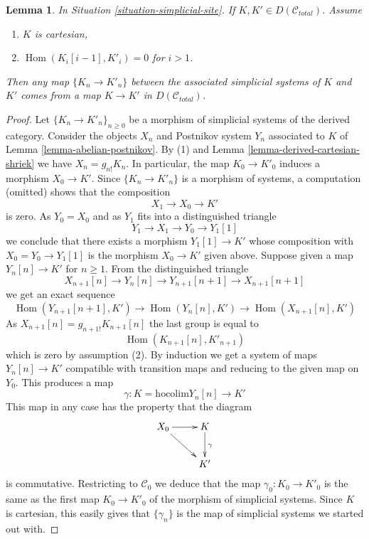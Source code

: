 \documentclass{stacks-project}
\theoremstyle{plain}
\newtheorem{lemma}[subsection]{Lemma}
\theoremstyle{definition}
\theoremstyle{remark}
\numberwithin{equation}{subsection}
\def\Hom{\mathop{\mathrm{Hom}}\nolimits}
\begin{document}
\begin{lemma}
\label{lemma-hom-cartesian-objects-derived}
In Situation \ref{situation-simplicial-site}.
If $K, K' \in D(\mathcal{C}_{total})$.
Assume
\begin{enumerate}
\item $K$ is cartesian,
\item $\Hom(K_i[i - 1], K'_i) = 0$ for $i > 1$.
\end{enumerate}
Then any map $\{K_n \to K'_n\}$ between the associated simplicial systems 
of $K$ and $K'$ comes from a map $K \to K'$ in $D(\mathcal{C}_{total})$.
\end{lemma}

\begin{proof}
Let $\{K_n \to K'_n\}_{n \geq 0}$
be a morphism of simplicial systems of the derived category.
Consider the objects $X_n$ and Postnikov system $Y_n$
associated to $K$ of Lemma \ref{lemma-abelian-postnikov}.
By (1) and Lemma \ref{lemma-derived-cartesian-shriek} we have
$X_n = g_{n!}K_n$. In particular, the map $K_0 \to K'_0$
induces a morphism $X_0 \to K'$. Since $\{K_n \to K'_n\}$
is a morphism of systems, a computation (omitted) shows that
the composition
$$
X_1 \to X_0 \to K'
$$
is zero. As $Y_0 = X_0$ and as $Y_1$ fits into a distinguished
triangle
$$
Y_1 \to X_1 \to Y_0 \to Y_1[1]
$$
we conclude that there exists a morphism $Y_1[1] \to K'$ whose
composition with $X_0 = Y_0 \to Y_1[1]$ is the morphism $X_0 \to K'$
given above. Suppose given a map $Y_n[n] \to K'$ for $n \geq 1$.
From the distinguished triangle
$$
X_{n + 1}[n] \to Y_n[n] \to Y_{n + 1}[n + 1] \to X_{n + 1}[n + 1]
$$
we get an exact sequence
$$
\Hom(Y_{n + 1}[n + 1], K') \to
\Hom(Y_n[n], K') \to
\Hom(X_{n + 1}[n], K')
$$
As $X_{n + 1}[n] = g_{n + 1!}K_{n + 1}[n]$ the last group is equal to
$$
\Hom(K_{n + 1}[n], K'_{n + 1})
$$
which is zero by assumption (2). By induction we get a system of
maps $Y_n[n] \to K'$ compatible with transition maps and reducing
to the given map on $Y_0$. This produces a map
$$
\gamma :
K = \text{hocolim} Y_n[n]
\longrightarrow
K'
$$
This map in any case has the property that the diagram
$$
\xymatrix{
X_0 \ar[rd] \ar[r] &
K \ar[d]^\gamma \\
& K'
}
$$
is commutative. Restricting to
$\mathcal{C}_0$ we deduce that the map $\gamma_0 : K_0 \to K'_0$
is the same as the first map $K_0 \to K'_0$ of the morphism
of simplicial systems. Since $K$ is cartesian, this easily gives that
$\{\gamma_n\}$ is the map of simplicial systems we started out with.
\end{proof}
\end{document}
